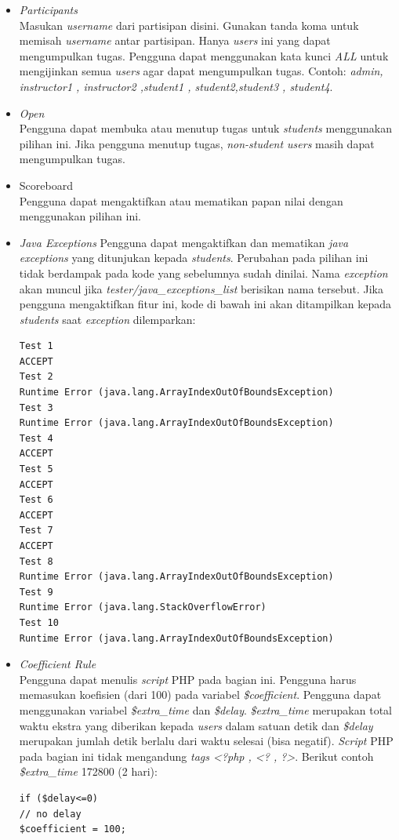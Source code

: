 \documentclass[a4paper,twoside]{article}
\begin{document}
\begin{enumerate}
\begin{enumerate}
\begin{itemize}
				\item \textit{Participants} \\
				Masukan \textit{username} dari partisipan disini. Gunakan tanda koma untuk memisah \textit{username} antar partisipan. Hanya \textit{users} ini yang dapat mengumpulkan tugas. Pengguna dapat menggunakan kata kunci \textit{ALL} untuk mengijinkan semua \textit{users} agar dapat mengumpulkan tugas. Contoh: \textit{admin, instructor1 , instructor2 ,student1  ,   student2,student3 , student4}.
				
				\item \textit{Open} \\
				Pengguna dapat membuka atau menutup tugas untuk \textit{students} menggunakan pilihan ini. Jika pengguna menutup tugas, \textit{non-student users} masih dapat mengumpulkan tugas.
				
				\item Scoreboard \\
				Pengguna dapat mengaktifkan atau mematikan papan nilai dengan menggunakan pilihan ini.
				
				\item \textit{Java Exceptions}
				Pengguna dapat mengaktifkan dan mematikan \textit{java exceptions} yang ditunjukan kepada \textit{students}. Perubahan pada pilihan ini tidak berdampak pada kode yang sebelumnya sudah dinilai. Nama \textit{exception} akan muncul jika \textit{tester/java\_exceptions\_list} berisikan nama tersebut. Jika pengguna mengaktifkan fitur ini, kode di bawah ini akan ditampilkan kepada \textit{students} saat \textit{exception} dilemparkan: \newpage
				\begin{lstlisting}[backgroundcolor = \color{lightgray}]
Test 1
ACCEPT
Test 2
Runtime Error (java.lang.ArrayIndexOutOfBoundsException)
Test 3
Runtime Error (java.lang.ArrayIndexOutOfBoundsException)
Test 4
ACCEPT
Test 5
ACCEPT
Test 6
ACCEPT
Test 7
ACCEPT
Test 8
Runtime Error (java.lang.ArrayIndexOutOfBoundsException)
Test 9
Runtime Error (java.lang.StackOverflowError)
Test 10
Runtime Error (java.lang.ArrayIndexOutOfBoundsException)				
				\end{lstlisting}
				
				\item \textit{\textit{Coefficient Rule}} \\
				Pengguna dapat menulis \textit{script} PHP pada bagian ini. Pengguna harus memasukan koefisien (dari 100) pada variabel \textit{\$coefficient}. Pengguna dapat menggunakan variabel \textit{\$extra\_time} dan \textit{\$delay}. \textit{\$extra\_time} merupakan total waktu ekstra yang diberikan kepada \textit{users} dalam satuan detik dan \textit{\$delay} merupakan jumlah detik berlalu dari waktu selesai (bisa negatif). \textit{Script} PHP pada bagian ini tidak mengandung \textit{tags <?php , <? , ?>}. Berikut contoh \textit{\$extra\_time} 172800 (2 hari):
				\begin{lstlisting}[backgroundcolor = \color{lightgray}]
if ($delay<=0)
// no delay
$coefficient = 100;


\end{lstlisting}
\end{itemize}
\end{enumerate}
\end{enumerate}
\end{document}
